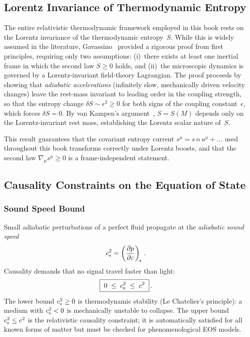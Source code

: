 \subsection{Lorentz Invariance of Thermodynamic Entropy}
\label{subsec:entropy-lorentz}

The entire relativistic thermodynamic framework employed in this book
rests on the Lorentz invariance of the thermodynamic entropy~$S$.
While this is widely assumed in the literature,
Gavassino~\citep{GavassinoLorentz2021} provided a rigorous proof from
first principles, requiring only two assumptions: (i)~there exists at
least one inertial frame in which the second law $\dot{S} \ge 0$
holds, and (ii)~the microscopic dynamics is governed by a Lorentz-invariant
field-theory Lagrangian.  The proof proceeds by showing that
\emph{adiabatic accelerations} (infinitely slow, mechanically driven
velocity changes) leave the rest-mass invariant to leading order in
the coupling strength, so that the entropy change
$\delta S \sim \epsilon^{2} \ge 0$ for both signs of the coupling
constant~$\epsilon$, which forces $\delta S = 0$.  By van Kampen's
argument~\citep{vanKampen1968}, $S = S(M)$ depends only on the
Lorentz-invariant rest mass, establishing the Lorentz scalar nature
of~$S$.

This result guarantees that the covariant entropy current
$s^{\mu} = s\,n\,u^{\mu} + \ldots$ used throughout this book
transforms correctly under Lorentz boosts, and that the second law
$\nabla_{\mu}s^{\mu} \ge 0$ is a frame-independent statement.

\subsection{Causality Constraints on the Equation of State}
\label{subsec:eos-causality}

\subsubsection{Sound Speed Bound}
Small adiabatic perturbations of a perfect fluid propagate at the
\emph{adiabatic sound speed}
\begin{equation}
  c_{\mathrm{s}}^{2} = \left(\frac{\partial p}{\partial\varepsilon}\right)_{\!s}\,.
  \label{eq:sound-speed}
\end{equation}
Causality demands that no signal travel faster than light:
\begin{equation}
  \boxed{\;0 \;\le\; c_{\mathrm{s}}^{2} \;\le\; c^{2}\;}\,.
  \label{eq:sound-causality}
\end{equation}
The lower bound $c_{\mathrm{s}}^{2} \ge 0$ is thermodynamic stability (Le
Chatelier's principle): a medium with $c_{\mathrm{s}}^{2} < 0$ is mechanically
unstable to collapse.  The upper bound $c_{\mathrm{s}}^{2} \le c^{2}$ is the
relativistic causality constraint; it is automatically satisfied for
all known forms of matter but must be checked for phenomenological EOS
models.

